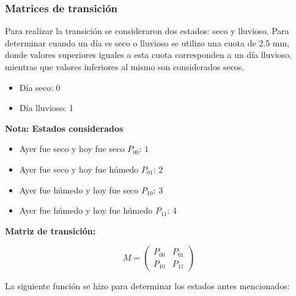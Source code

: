 \documentclass[]{article}
\providecommand{\tightlist}{%
  \setlength{\itemsep}{0pt}\setlength{\parskip}{0pt}}
\begin{document}
\hypertarget{matrices-de-transicion}{%
\subsubsection{Matrices de transición}\label{matrices-de-transicion}}

Para realizar la transición se consideraron dos estados: seco y
lluvioso. Para determinar cuando un día es seco o lluvioso se utilizo
una cuota de 2.5 mm, donde valores superiores iguales a esta cuota
corresponden a un día lluvioso, mientras que valores inferiores al mismo
son considerados secos.

\begin{itemize}
\tightlist
\item
  Día seco: 0
\item
  Día lluvioso: 1
\end{itemize}

\textbf{Nota: Estados considerados}

\begin{itemize}
\tightlist
\item
  Ayer fue seco y hoy fue seco \(P_{00}\): \(1\)
\item
  Ayer fue seco y hoy fue húmedo \(P_{01}\): \(2\)
\item
  Ayer fue húmedo y hoy fue seco \(P_{10}\): \(3\)
\item
  Ayer fue húmedo y hoy fue húmedo \(P_{11}\): \(4\)
\end{itemize}

\textbf{Matriz de transición:}

\[M=\left( \begin{array}{cccc}
 P_{00} & P_{01} \\ 
 P_{10} & P_{11}
\end{array} \right)\]

La siguiente función se hizo para determinar los estados antes
mencionados:
\end{document}
